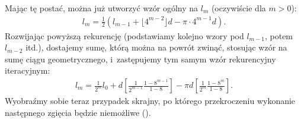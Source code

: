 \begin{szeroko}
\begin{tcolorbox}[lower separated=false, colback=white, colframe=magenta,fonttitle=\bfseries, colbacktitle=black, coltitle=white]
\begin{enumerate}[label={$n=\arabic*$},itemsep=6pt]
		\end{enumerate}
	\end{tcolorbox}
      \end{szeroko}
      
	Mając tę postać, można już utworzyć wzór ogólny na $l_m$ (oczywiście dla $m > 0$):
	\begin{gather*}
	l_m = \frac{1}{2}(l_{m-1}+ \lfloor 4^{m-2}\rfloor d - \pi \cdot  4^{m-1} d).
	\end{gather*}
		  Rozwijając powyższą rekurencję (podstawiamy kolejno wzory pod $l_{m-1}$, potem~$l_{m-2}$ itd.), 
		dostajemy sumę, którą można na powrót zwinąć, stosując wzór na sumę ciągu geometrycznego, i~zastępujemy
 tym samym wzór rekurencyjny iteracyjnym:
		\begin{gather*}
			l_m = \frac{1}{2^{m}}l_0 + d\left[\frac{1}{2^{m-1}}\frac{1-8^{m-1}}{1-8}\right] - \pi d{\left[\frac{1}{2^{m}}\frac{1-8^{m}}{1-8}\right]}.
		\end{gather*}
		Wyobraźmy sobie teraz przypadek skrajny, po którego przekroczeniu %
		wykonanie następnego zgięcia będzie niemożliwe ().
		
